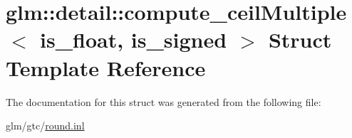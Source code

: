 \hypertarget{structglm_1_1detail_1_1compute__ceilMultiple}{\section{glm\-:\-:detail\-:\-:compute\-\_\-ceil\-Multiple$<$ is\-\_\-float, is\-\_\-signed $>$ Struct Template Reference}
\label{structglm_1_1detail_1_1compute__ceilMultiple}
}


The documentation for this struct was generated from the following file\-:\begin{DoxyCompactItemize}
\item 
glm/gtc/\hyperlink{round_8inl}{round.\-inl}\end{DoxyCompactItemize}
